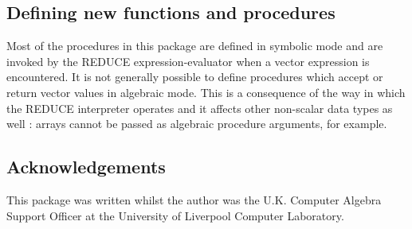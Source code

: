\subsection{Defining new functions and procedures}

Most of the procedures in this package are defined in symbolic mode
and are invoked by the REDUCE expression-evaluator when a vector
expression is encountered. It is not generally possible to define
procedures which accept or return vector values in algebraic mode.
This is a consequence of the way in which the REDUCE interpreter
operates and it affects other non-scalar data types as well : arrays
cannot be passed as algebraic procedure arguments, for example.

\subsection{Acknowledgements}

This package was written whilst the author was the U.K. Computer
Algebra Support Officer at the University of Liverpool Computer Laboratory.

